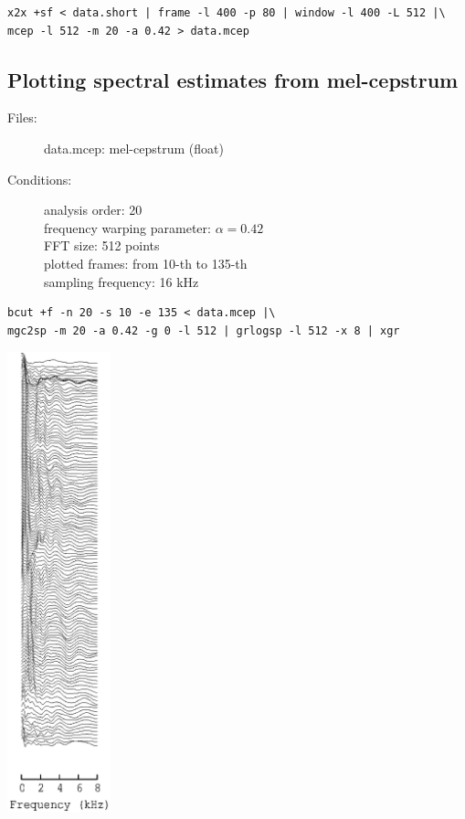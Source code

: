\documentclass[a4paper,10pt]{article}
\begin{document}
\begin{verbatim}
x2x +sf < data.short | frame -l 400 -p 80 | window -l 400 -L 512 |\
mcep -l 512 -m 20 -a 0.42 > data.mcep
\end{verbatim}

\subsection{Plotting spectral estimates from mel-cepstrum}

\begin{description}
\item[Files:]
  data.mcep: mel-cepstrum (float)
\item[Conditions:]
  analysis order: 20\\
  frequency warping parameter: $\alpha = 0.42$\\
  FFT size: 512 points\\
  plotted frames: from 10-th to 135-th\\
  sampling frequency: 16 kHz
\end{description}

\begin{verbatim}
bcut +f -n 20 -s 10 -e 135 < data.mcep |\
mgc2sp -m 20 -a 0.42 -g 0 -l 512 | grlogsp -l 512 -x 8 | xgr
\end{verbatim}

\includegraphics[width=3cm]{eps/data.mcep.grlogsp.eps}
\end{document}

